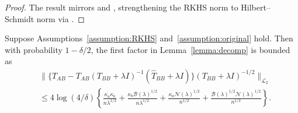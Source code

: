 \begin{proof}
The result mirrors \cite[eq. 44]{fischer2017sobolev} and \cite[eq. 34]{talwai2022sobolev},
strengthening the RKHS norm to Hilbert--Schmidt norm via \cite[Proposition 22]{singh2019kernel}.
\end{proof}

\begin{lemma}\label{lemma:1}
Suppose Assumptions~\ref{assumption:RKHS} and~\ref{assumption:original} hold. Then with probability $1-\delta/2$, the first factor in Lemma~\ref{lemma:decomp} is bounded as 
\begin{align*}
  &\|\{\hat{T}_{AB}-T_{AB}(T_{BB}+\lambda I)^{-1}(\hat{T}_{BB}+\lambda I)\}(T_{BB}+\lambda I)^{-1/2}\|_{\mathcal{L}_2} \\
  &\leq 
    4\log(4/\delta) \left\{\frac{\kappa_a\kappa_b}{n\lambda^{1/2}}+\frac{\kappa_b\mathcal{B}(\lambda)^{1/2}}{n\lambda^{1/2}}+\frac{\kappa_a \mathcal{N}(\lambda)^{1/2}}{n^{1/2}}+\frac{\mathcal{B}(\lambda)^{1/2}\mathcal{N}(\lambda)^{1/2}}{n^{1/2}}\right\}.
\end{align*}
\end{lemma}

